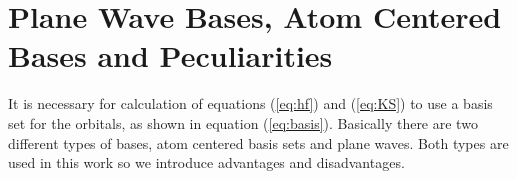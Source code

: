 \documentclass[11pt,DIV=13,BCOR=5mm,a4paper,headinclude]{scrbook}
\renewcommand{\vec}[1]{\underline{#1}}
\def\doubleunderline#1{\underline{\underline{#1}}}
\begin{document}
% 




\section{Plane Wave Bases, Atom Centered Bases and Peculiarities}
It is necessary for calculation of equations (\ref{eq:hf}) and (\ref{eq:KS}) to use a basis set for the orbitals, as shown in equation (\ref{eq:basis}).
Basically there are two different types of bases, atom centered basis sets and plane waves.
Both types are used in this work so we introduce advantages and disadvantages\cite{Tosoni2007}.
\end{document}
